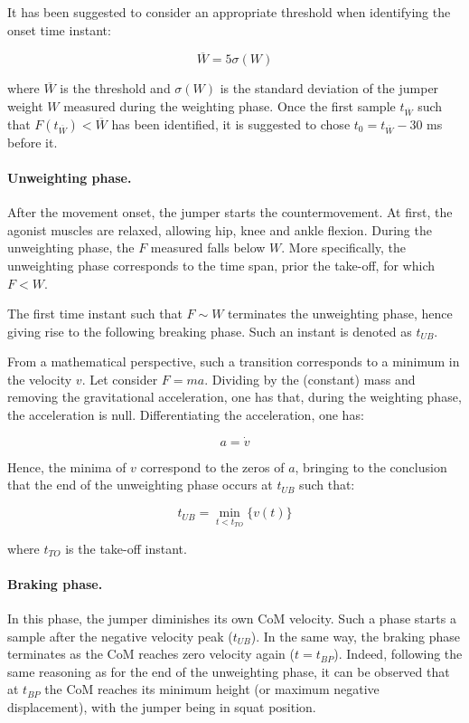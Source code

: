 It has been suggested \citep{owen_threshold_2014} to consider an appropriate threshold when identifying the onset time instant:

\begin{equation}\label{eq:onset_threshold}
	\overline{W} = 5 \sigma(W)
\end{equation}

where $\overline{W}$ is the threshold and $\sigma(W)$ is the standard deviation of the jumper weight $W$ measured during the weighting phase. Once the first sample $t_{\overline{W}}$ such that $F(t_{\overline{W}}) < \overline{W}$ has been identified, it is suggested to chose $t_0 = t_{\overline{W}} - 30$ ms before it. 

\paragraph{Unweighting phase.} After the movement onset, the jumper starts the countermovement. At first, the agonist muscles are relaxed, allowing hip, knee and ankle flexion. During the unweighting phase, the $F$ measured falls below $W$. More specifically, the unweighting phase corresponds to the time span, prior the take-off, for which $F < W$. 

The first time instant such that $F \sim W$ terminates the unweighting phase, hence giving rise to the following breaking phase. Such an instant is denoted as $t_{UB}$. 

From a mathematical perspective, such a transition corresponds to a minimum in the velocity $v$. Let consider $F = m a$. Dividing by the (constant) mass and removing the gravitational acceleration, one has that, during the weighting phase, the acceleration is null. Differentiating the acceleration, one has:

\begin{equation}\label{eq:unweighting_acc}
	a = \dot{v}
\end{equation}

Hence, the minima of $v$ correspond to the zeros of $a$, bringing to the conclusion that the end of the unweighting phase occurs at $t_{UB}$ such that:

\begin{equation}\label{eq:unweighting_transition}
	t_{UB} = \min_{t < t_{TO}} \{ v(t) \}
\end{equation}

where $t_{TO}$ is the take-off instant. 

\paragraph{Braking phase.} In this phase, the jumper diminishes its own CoM velocity. Such a phase starts a sample after the negative velocity peak ($t_{UB}$). In the same way, the braking phase terminates as the CoM reaches zero velocity again ($t = t_{BP}$). Indeed, following the same reasoning as for the end of the unweighting phase, it can be observed that at $t_{BP}$ the CoM reaches its minimum height (or maximum negative displacement), with the jumper being in squat position.


